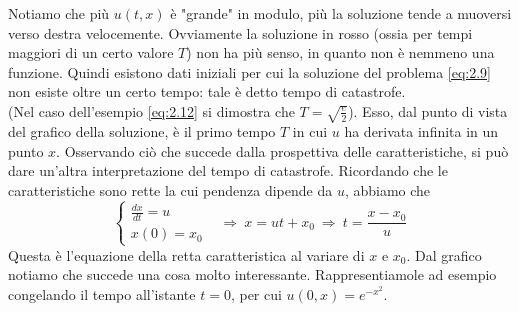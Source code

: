 Notiamo che più $u(t,x)$ è "grande" in modulo, più la soluzione tende a muoversi verso destra velocemente. Ovviamente la soluzione in rosso (ossia per tempi maggiori di un certo valore $T$) non ha più senso, in quanto non è nemmeno una funzione. Quindi esistono dati iniziali per cui la soluzione del problema \eqref{eq:2.9} non esiste oltre un certo tempo: tale è detto tempo di catastrofe. \\
(Nel caso dell'esempio \eqref{eq:2.12} si dimostra che $T = \sqrt{\frac{e}{2}}$).
Esso, dal punto di vista del grafico della soluzione, è il primo tempo $T$ in cui $u$ ha derivata infinita in un punto $x$.
Osservando ciò che succede dalla prospettiva delle caratteristiche, si può dare un'altra interpretazione del tempo di catastrofe. Ricordando che le caratteristiche sono rette la cui pendenza dipende da $u$, abbiamo che
\begin{equation}\label{eq:2.14}
    \begin{cases}
        \frac{dx}{dt} = u\\
        x(0) = x_{0}&
    \end{cases}
    \Longrightarrow \ x = ut + x_{0} \ \Longrightarrow \ t = \frac{x-x_{0}}{u}
\end{equation}
Questa è l'equazione della retta caratteristica al variare di $x$ e $x_{0}$. Dal grafico notiamo che succede una cosa molto interessante. Rappresentiamole ad esempio congelando il tempo all'istante $t = 0$, per cui $u(0,x) = e^{-x^{2}}$.

\begin{figure}[H]
\begin{center}
\caption{}
\end{center}
\end{figure}

